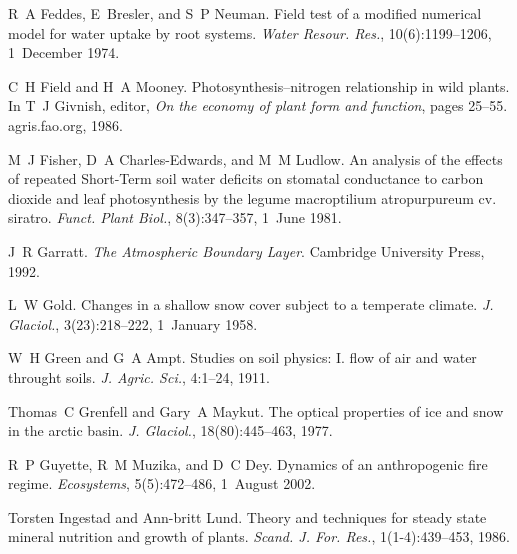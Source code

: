 \begin{DoxyDescription}
\item[\label{_CITEREF_Feddes1974-ff}%
\mbox{[}33\mbox{]}]R~A Feddes, E~Bresler, and S~P Neuman. Field test of a modified numerical model for water uptake by root systems. {\itshape Water Resour. Res.}, 10(6)\+:1199--1206, 1~December 1974. 


\item[\label{_CITEREF_Field1986-kd}%
\mbox{[}34\mbox{]}]C~H Field and H~A Mooney. Photosynthesis--nitrogen relationship in wild plants. In T~J Givnish, editor, {\itshape On the economy of plant form and function}, pages 25--55. agris.\+fao.\+org, 1986.


\item[\label{_CITEREF_Fisher1981-xf}%
\mbox{[}35\mbox{]}]M~J Fisher, D~A Charles-\/\+Edwards, and M~M Ludlow. An analysis of the effects of repeated Short-\/\+Term soil water deficits on stomatal conductance to carbon dioxide and leaf photosynthesis by the legume macroptilium atropurpureum cv. siratro. {\itshape Funct. Plant Biol.}, 8(3)\+:347--357, 1~June 1981. 


\item[\label{_CITEREF_Garratt1992-dt}%
\mbox{[}36\mbox{]}]J~R Garratt. {\itshape The Atmospheric Boundary Layer}. Cambridge University Press, 1992.


\item[\label{_CITEREF_Gold1958-ng}%
\mbox{[}37\mbox{]}]L~W Gold. Changes in a shallow snow cover subject to a temperate climate. {\itshape J. Glaciol.}, 3(23)\+:218--222, 1~January 1958.


\item[\label{_CITEREF_Green1911-gy}%
\mbox{[}38\mbox{]}]W~H Green and G~A Ampt. Studies on soil physics\+: I. flow of air and water throught soils. {\itshape J. Agric. Sci.}, 4\+:1--24, 1911.


\item[\label{_CITEREF_Grenfell1977-pi}%
\mbox{[}39\mbox{]}]Thomas~C Grenfell and Gary~A Maykut. The optical properties of ice and snow in the arctic basin. {\itshape J. Glaciol.}, 18(80)\+:445--463, 1977.


\item[\label{_CITEREF_Guyette2002-rc}%
\mbox{[}40\mbox{]}]R~P Guyette, R~M Muzika, and D~C Dey. Dynamics of an anthropogenic fire regime. {\itshape Ecosystems}, 5(5)\+:472--486, 1~August 2002. 


\item[\label{_CITEREF_Ingestad1986-td}%
\mbox{[}41\mbox{]}]Torsten Ingestad and Ann-\/britt Lund. Theory and techniques for steady state mineral nutrition and growth of plants. {\itshape Scand. J. For. Res.}, 1(1-\/4)\+:439--453, 1986. 



\end{DoxyDescription}

